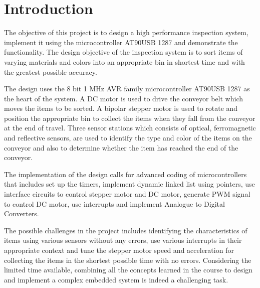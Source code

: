 \section{Introduction}\label{sec:intro}
The objective of this project is to design a high performance inspection system, implement it using the microcontroller AT90USB 1287 and demonstrate the functionality. The design objective of the inspection system is to sort items of varying materials and colors into an appropriate bin in shortest time and with the greatest possible accuracy. 

The design uses the 8 bit 1 MHz AVR family microcontroller AT90USB 1287 as the heart of the system. A DC motor is used to drive the conveyor belt which moves the items to be sorted. A bipolar stepper motor is used to rotate and position the appropriate bin to collect the items when they fall from the conveyor at the end of travel. Three sensor stations which consists of optical, ferromagnetic and reflective sensors, are used to identify the type and color of the items on the conveyor and also to determine whether the item has reached the end of the conveyor. 

The implementation of the design calls for advanced coding of microcontrollers that includes set up the  timers, implement dynamic linked list using pointers, use interface circuits to control stepper motor and DC motor, generate PWM signal to control DC motor,  use interrupts and implement Analogue to Digital Converters. 

The possible challenges in the project includes identifying the characteristics of items using various sensors without any errors, use various interrupts in their appropriate context and tune the stepper motor speed and acceleration for collecting the items in the shortest possible time with no errors. Considering the limited time available, combining all the concepts learned in the course to design and implement a complex embedded system is indeed a challenging task.
